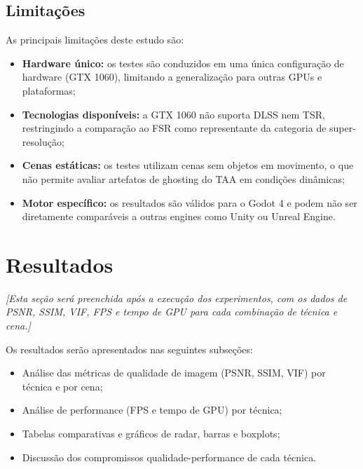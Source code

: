 \documentclass[twoside,english,brazilian]{UNISINOSmonografia}
\begin{document}
\section{Limitações}

As principais limitações deste estudo são:

\begin{itemize}
    \item \textbf{Hardware único:} os testes são conduzidos em uma única configuração de hardware (GTX 1060), limitando a generalização para outras GPUs e plataformas;
    \item \textbf{Tecnologias disponíveis:} a GTX 1060 não suporta DLSS nem TSR, restringindo a comparação ao FSR como representante da categoria de super-resolução;
    \item \textbf{Cenas estáticas:} os testes utilizam cenas sem objetos em movimento, o que não permite avaliar artefatos de ghosting do TAA em condições dinâmicas;
    \item \textbf{Motor específico:} os resultados são válidos para o Godot 4 e podem não ser diretamente comparáveis a outras engines como Unity ou Unreal Engine.
\end{itemize}

\chapter{Resultados}

\textit{[Esta seção será preenchida após a execução dos experimentos, com os dados de PSNR, SSIM, VIF, FPS e tempo de GPU para cada combinação de técnica e cena.]}

Os resultados serão apresentados nas seguintes subseções:

\begin{itemize}
    \item Análise das métricas de qualidade de imagem (PSNR, SSIM, VIF) por técnica e por cena;
    \item Análise de performance (FPS e tempo de GPU) por técnica;
    \item Tabelas comparativas e gráficos de radar, barras e boxplots;
    \item Discussão dos compromissos qualidade-performance de cada técnica.
\end{itemize}
\end{document}
